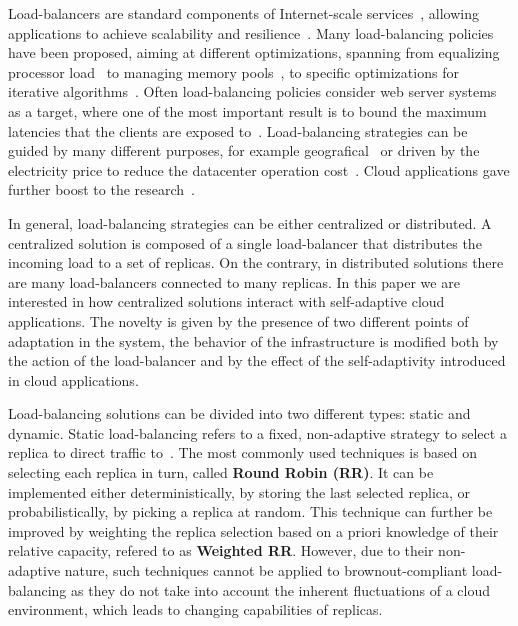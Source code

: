 Load-balancers are standard components of Internet-scale
services~\cite{WangOSDI}, allowing applications to achieve scalability
and resilience~\citep{Barroso09, Hamilton07:LISA,
  clusteredbalancing}. Many load-balancing policies have been
proposed, aiming at different optimizations, spanning from equalizing
processor load~\cite{Stankovic:TC} to managing memory
pools~\cite{PattersonMemoryLB,MemoryLBACC}, to specific optimizations
for iterative algorithms~\cite{BahiIterative}. Often load-balancing
policies consider web server systems~\cite{CLB,Cardellini2003} as a
target, where one of the most important result is to bound the maximum
latencies that the clients are exposed
to~\cite{TC-Abdelzaher}. Load-balancing strategies can be guided by
many different purposes, for example
geografical~\cite{GeograficalSASO,geographicalwanbalancing} or driven
by the electricity price to reduce the datacenter operation 
cost~\cite{LoadBalancingForElectricity:TCC}. Cloud applications gave 
further boost to the research~\citep{Barroso09,Lu11:PerfEval,Lin12:IGCC}.

In general, load-balancing strategies can be either centralized or
distributed. A centralized solution is composed of a single
load-balancer that distributes the incoming load to a set of
replicas. On the contrary, in distributed solutions there are many
load-balancers connected to many replicas. In this paper we are
interested in how centralized solutions interact with self-adaptive
cloud applications. The novelty is given by the presence of two
different points of adaptation in the system, the behavior of the
infrastructure is modified both by the action of the load-balancer and
by the effect of the self-adaptivity introduced in cloud applications.

Load-balancing solutions can be divided into two different types:
static and dynamic. Static load-balancing refers to a fixed,
non-adaptive strategy to select a replica to direct traffic
to~\cite{StaticLoadBalancing:TSE,StaticOptimal:ACM}.  The most
commonly used techniques is based on selecting each replica in turn,
called \textbf{Round Robin (RR)}. It can be implemented either
deterministically, by storing the last selected replica, or
probabilistically, by picking a replica at random.  This technique can
further be improved by weighting the replica selection based on a
priori knowledge of their relative capacity, refered to as
\textbf{Weighted RR}.  However, due to their non-adaptive nature, such
techniques cannot be applied to brownout-compliant load-balancing as
they do not take into account the inherent fluctuations of a cloud
environment, which leads to changing capabilities of replicas.

